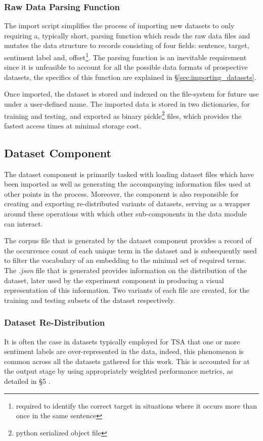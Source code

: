 \documentclass[12pt, a4paper]{report}
\theoremstyle{definition}
\theoremstyle{definition}%
\theoremstyle{definition}%
\theoremstyle{definition}%
\theoremstyle{definition}%
\theoremstyle{definition}%
\begin{document}
\subsubsection{Raw Data Parsing Function}
The import script simplifies the process of importing new datasets to only requiring a, typically short, parsing function which reads the raw data files and mutates the data structure to records consisting of four fields: sentence, target, sentiment label and, offset\footnote{required to identify the correct target in situations where it occurs more than once in the same sentence}. The parsing function is an inevitable requirement since it is unfeasible to account for all the possible data formats of prospective datasets, the specifics of this function are explained in \S\ref{sec:importing_datasets}.

Once imported, the dataset is stored and indexed on the file-system for future use under a user-defined name. The imported data is stored in two dictionaries, for training and testing, and exported as binary pickle\footnote{python serialized object file} files, which provides the fastest access times at minimal storage cost.

\subsection{Dataset Component}
The dataset component is primarily tasked with loading dataset files which have been imported as well as generating the accompanying information files used at other points in the process. Moreover, the component is also responsible for creating and exporting re-distributed variants of datasets, serving as a wrapper around these operations with which other sub-components in the data module can interact.

The corpus file that is generated by the dataset component provides a record of the occurrence count of each unique term in the dataset and is subsequently used to filter the vocabulary of an embedding to the minimal set of required terms. The \textit{.json} file that is generated provides information on the distribution of the dataset, later used by the experiment component in producing a visual representation of this information. Two variants of each file are created, for the training and testing subsets of the dataset respectively.

\subsubsection{Dataset Re-Distribution}
It is often the case in datasets typically employed for TSA that one or more sentiment labels are over-represented in the data, indeed, this phenomenon is common across all the datasets gathered for this work. This is accounted for at the output stage by using appropriately weighted performance metrics, as detailed in \S5 .
\end{document}
